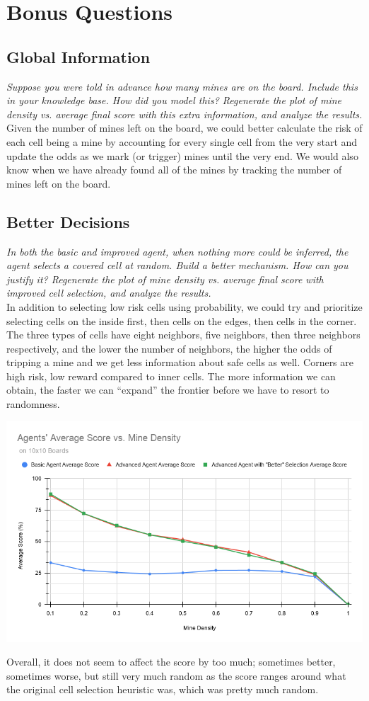 \documentclass[11pt]{article} %
\begin{document}
\section{\textbf{Bonus Questions}}

\subsection{Global Information}

\textit{Suppose you were told in advance how many mines are on the board. Include this in your knowledge base. How did you model this? Regenerate the plot of mine density vs. average final score with this extra information, and analyze the results.}\\

Given the number of mines left on the board, we could better calculate the risk of each cell being a mine by accounting for every single cell from the very start and update the odds as we mark (or trigger) mines until the very end. We would also know when we have already found all of the mines by tracking the number of mines left on the board.

\subsection{Better Decisions}

\textit{In both the basic and improved agent, when nothing more could be inferred, the agent selects a covered cell at random. Build a better mechanism. How can you justify it? Regenerate the plot of mine density vs. average final score with improved cell selection, and analyze the results.}\\

In addition to selecting low risk cells using probability, we could try and prioritize selecting cells on the inside first, then cells on the edges, then cells in the corner. The three types of cells have eight neighbors, five neighbors, then three neighbors respectively, and the lower the number of neighbors, the higher the odds of tripping a mine and we get less information about safe cells as well. Corners are high risk, low reward compared to inner cells. The more information we can obtain, the faster we can “expand” the frontier before we have to resort to randomness.

\begin{center}
\includegraphics*[scale=0.5]{plot2.png}\\
\end{center}

Overall, it does not seem to affect the score by too much; sometimes better, sometimes worse, but still very much random as the score ranges around what the original cell selection heuristic was, which was pretty much random.
\end{document}
